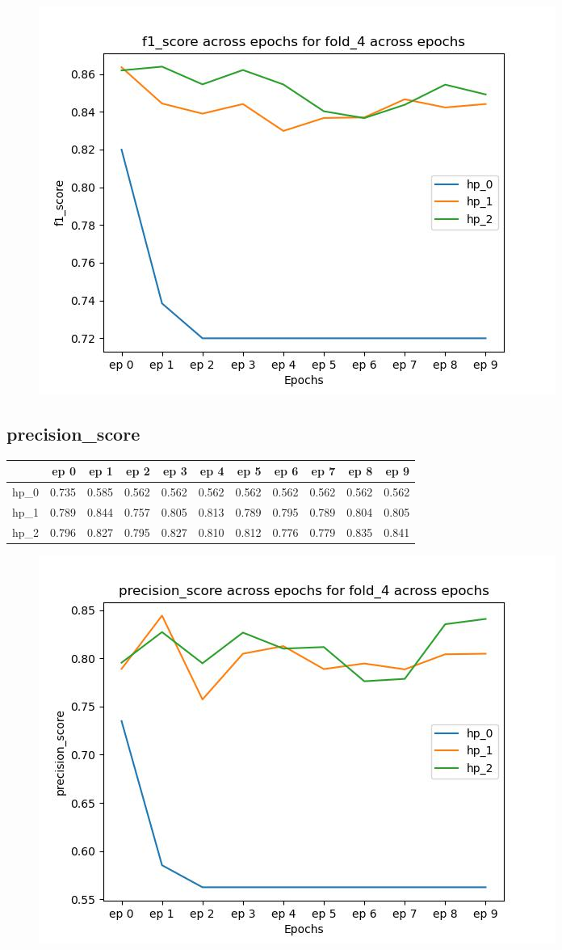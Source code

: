 \documentclass{article}
\begin{document}
\begin{figure}[H]
\includegraphics[scale = 0.75]{fold_4/f1_score}
\end{figure}
\subsection{precision\_score}
\begin{tabular}{lrrrrrrrrrr}
\toprule
{} &   ep 0 &   ep 1 &   ep 2 &   ep 3 &   ep 4 &   ep 5 &   ep 6 &   ep 7 &   ep 8 &   ep 9 \\
\midrule
hp\_0 &  0.735 &  0.585 &  0.562 &  0.562 &  0.562 &  0.562 &  0.562 &  0.562 &  0.562 &  0.562 \\
hp\_1 &  0.789 &  0.844 &  0.757 &  0.805 &  0.813 &  0.789 &  0.795 &  0.789 &  0.804 &  0.805 \\
hp\_2 &  0.796 &  0.827 &  0.795 &  0.827 &  0.810 &  0.812 &  0.776 &  0.779 &  0.835 &  0.841 \\
\bottomrule
\end{tabular}

\begin{figure}[H]
\includegraphics[scale = 0.75]{fold_4/precision_score}
\end{figure}
\end{document}
